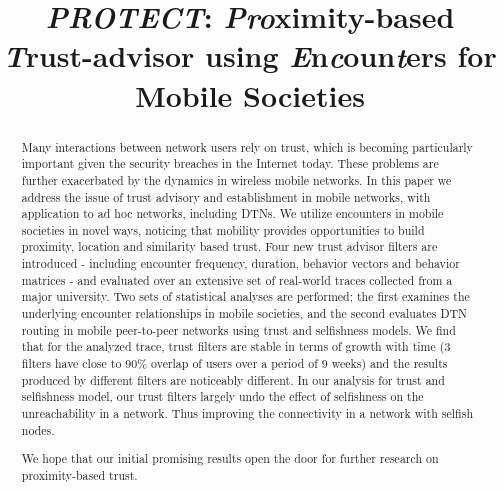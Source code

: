 \documentclass[10pt,conference]{IEEEtran}
\begin{document}
\title{\textit{PROTECT}: \textit{Pro}ximity-based \textit{T}rust-advisor using \textit{E}n\textit{c}oun\textit{t}ers for Mobile Societies}
\author{
 }

\maketitle
\begin{abstract}
 Many interactions between network users rely on trust, which is becoming particularly important given the security breaches in the Internet today. These problems are further exacerbated by the dynamics in wireless mobile networks. In this paper we address the issue of trust advisory and establishment in mobile networks, with application to ad hoc networks, including DTNs. We utilize encounters in mobile societies in novel ways, noticing that mobility provides opportunities to build proximity, location and similarity based trust. Four new trust advisor filters are introduced - including encounter frequency, duration, behavior vectors and behavior matrices - and evaluated over an extensive set of real-world traces collected from a major university. Two sets of statistical analyses are performed; the first examines the underlying encounter relationships in mobile societies, and the second evaluates DTN routing in mobile peer-to-peer networks using trust and selfishness models. We find that for the analyzed trace,  trust filters are stable in terms of growth with time (3 filters have close to  90\% overlap of users over a period of 9 weeks) and the results produced by different filters are noticeably different. In our analysis for trust and selfishness model, our trust filters largely undo the effect of selfishness on the unreachability in a network. Thus improving the connectivity in a network with selfish nodes. 
 
We hope that our initial promising results open the door for further research on proximity-based trust.







\end{abstract}
\end{document}
